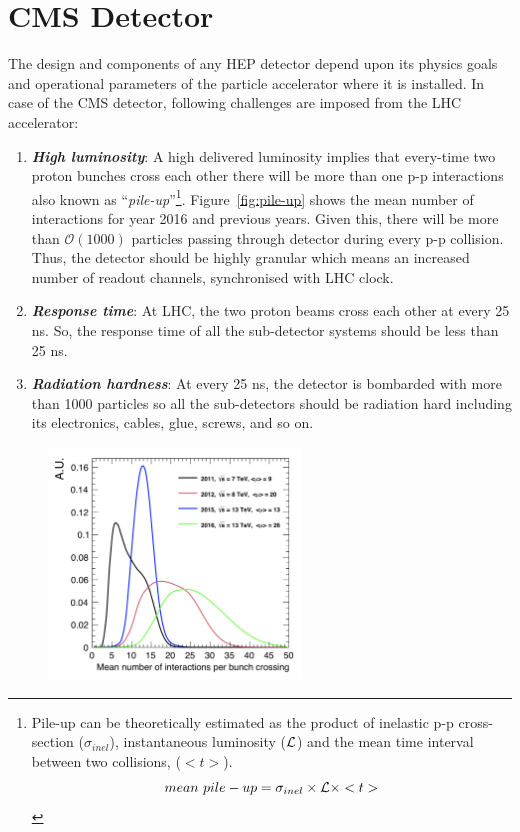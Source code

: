 {{{\section{CMS Detector} %
\label{sec:cms_experiment}
The design and components of any HEP detector depend upon its physics goals and operational parameters of the particle accelerator where it is installed. In case of the CMS detector, following challenges are imposed from the LHC accelerator:
\begin{enumerate}
	\item \textbf{ \textit{High luminosity}}: A high delivered luminosity implies that every-time two proton bunches cross each other there will be more than one p-p interactions also known as ``\textit{pile-up}''\footnote{Pile-up can be theoretically estimated as the product of inelastic p-p cross-section ($\sigma_{inel}$), instantaneous luminosity ($\mathcal{L}$) and the mean time interval between two collisions, ($< t >$). \begin{equation}
		mean~pile-up = \sigma_{inel} \times \mathcal{L} \times <t>
	\end{equation}}. Figure~\ref{fig:pile-up} shows the mean number of interactions for year 2016 and previous years. Given this, there will be more than $\mathcal{O}(1000)$ particles passing through detector during every p-p collision. Thus, the detector should be highly granular which means an increased number of readout channels, synchronised with LHC clock.
	\item \textbf{\textit{Response time}}: At LHC, the two proton beams cross each other at every 25 ns. So, the response time of all the sub-detector systems should be less than 25 ns.
	\item \textbf{\textit{Radiation hardness}}: At every 25 ns, the detector is bombarded with more than 1000 particles so all the sub-detectors should be radiation hard including its electronics, cables, glue, screws, and so on.
\end{enumerate}
\begin{figure}[!htbp]
	\centering
	\includegraphics[width=0.60\textwidth]{figures/LHC/pileup.jpg}

\end{figure}}}}
